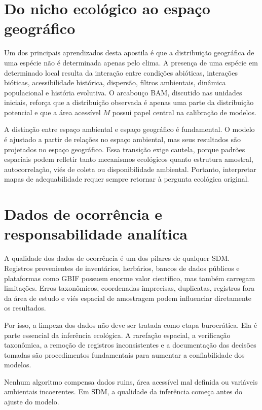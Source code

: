 \section{Do nicho ecológico ao espaço geográfico}

Um dos principais aprendizados desta apostila é que a distribuição geográfica de uma espécie não é determinada apenas pelo clima. A presença de uma espécie em determinado local resulta da interação entre condições abióticas, interações bióticas, acessibilidade histórica, dispersão, filtros ambientais, dinâmica populacional e história evolutiva. O arcabouço BAM, discutido nas unidades iniciais, reforça que a distribuição observada é apenas uma parte da distribuição potencial e que a área acessível \(M\) possui papel central na calibração de modelos.

A distinção entre espaço ambiental e espaço geográfico é fundamental. O modelo é ajustado a partir de relações no espaço ambiental, mas seus resultados são projetados no espaço geográfico. Essa transição exige cautela, porque padrões espaciais podem refletir tanto mecanismos ecológicos quanto estrutura amostral, autocorrelação, viés de coleta ou disponibilidade ambiental. Portanto, interpretar mapas de adequabilidade requer sempre retornar à pergunta ecológica original.

\section{Dados de ocorrência e responsabilidade analítica}

A qualidade dos dados de ocorrência é um dos pilares de qualquer SDM. Registros provenientes de inventários, herbários, bancos de dados públicos e plataformas como GBIF possuem enorme valor científico, mas também carregam limitações. Erros taxonômicos, coordenadas imprecisas, duplicatas, registros fora da área de estudo e viés espacial de amostragem podem influenciar diretamente os resultados.

Por isso, a limpeza dos dados não deve ser tratada como etapa burocrática. Ela é parte essencial da inferência ecológica. A rarefação espacial, a verificação taxonômica, a remoção de registros inconsistentes e a documentação das decisões tomadas são procedimentos fundamentais para aumentar a confiabilidade dos modelos.

\begin{atencao}[title={\faExclamationTriangle\quad Dados bons antes de modelos complexos}]
	Nenhum algoritmo compensa dados ruins, área acessível mal definida ou variáveis ambientais incoerentes. Em SDM, a qualidade da inferência começa antes do ajuste do modelo.
\end{atencao}

